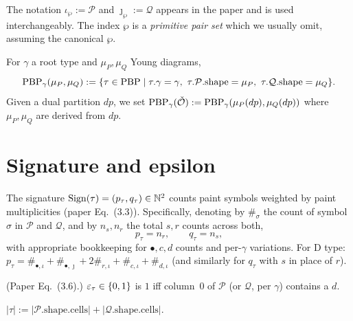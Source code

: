 \begin{remark}
  The notation $\iota_\wp := \mathcal{P}$ and $\jmath_\wp := \mathcal{Q}$ appears in the paper and is used interchangeably. The index $\wp$ is a \emph{primitive pair set} which we usually omit, assuming the canonical $\wp$.
\end{remark}

\begin{definition}
  \label{def:PBPSet}
  \leanok
  For $\gamma$ a root type and $\mu_P, \mu_Q$ Young diagrams,
  \[ \PBP_\gamma(\mu_P, \mu_Q) := \{\tau \in \mathrm{PBP} \mid \tau.\gamma = \gamma,\ \tau.\mathcal{P}.\mathrm{shape} = \mu_P,\ \tau.\mathcal{Q}.\mathrm{shape} = \mu_Q\}. \]
  Given a dual partition $dp$, we set $\mathrm{PBP}_\gamma(\check{\mathcal{O}}) := \mathrm{PBP}_\gamma(\mu_P(dp), \mu_Q(dp))$ where $\mu_P, \mu_Q$ are derived from $dp$.
\end{definition}

\section{Signature and epsilon}

\begin{definition}
  \label{def:signature_pbp}
  \leanok
  The signature $\mathrm{Sign}(\tau) = (p_\tau, q_\tau) \in \mathbb{N}^2$ counts paint
  symbols weighted by paint multiplicities (paper Eq.~(3.3)). Specifically,
  denoting by $\#_\sigma$ the count of symbol $\sigma$ in $\mathcal{P}$ and $\mathcal{Q}$,
  and by $n_s, n_r$ the total $s, r$ counts across both,
  \[
    p_\tau = n_r, \qquad q_\tau = n_s,
  \]
  with appropriate bookkeeping for $\bullet, c, d$ counts and per-$\gamma$ variations.
  For D type: $p_\tau = \#_{\bullet,\iota} + \#_{\bullet,\jmath} + 2\#_{r,\iota} + \#_{c,\iota} + \#_{d,\iota}$ (and similarly for $q_\tau$ with $s$ in place of $r$).
\end{definition}

\begin{definition}
  \label{def:epsilon_pbp}
  \leanok
  (Paper Eq.~(3.6).) $\varepsilon_\tau \in \{0, 1\}$ is $1$ iff column~0 of $\mathcal{P}$ (or $\mathcal{Q}$, per $\gamma$) contains a $d$.
\end{definition}

\begin{definition}
  \label{def:cardCells}
  \leanok
  $|\tau| := |\mathcal{P}.\mathrm{shape}.\mathrm{cells}| + |\mathcal{Q}.\mathrm{shape}.\mathrm{cells}|$.
\end{definition}

